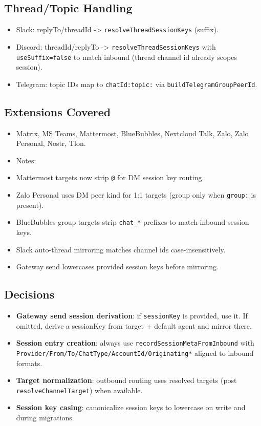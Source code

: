 \subsection{Thread/Topic Handling}


\begin{itemize}
  \item Slack: replyTo/threadId -> \texttt{resolveThreadSessionKeys} (suffix).
  \item Discord: threadId/replyTo -> \texttt{resolveThreadSessionKeys} with \texttt{useSuffix=false} to match inbound (thread channel id already scopes session).
  \item Telegram: topic IDs map to \texttt{chatId:topic:} via \texttt{buildTelegramGroupPeerId}.
\end{itemize}


\subsection{Extensions Covered}


\begin{itemize}
  \item Matrix, MS Teams, Mattermost, BlueBubbles, Nextcloud Talk, Zalo, Zalo Personal, Nostr, Tlon.
  \item Notes:
  \item Mattermost targets now strip \texttt{@} for DM session key routing.
  \item Zalo Personal uses DM peer kind for 1:1 targets (group only when \texttt{group:} is present).
  \item BlueBubbles group targets strip \texttt{chat\_*} prefixes to match inbound session keys.
  \item Slack auto-thread mirroring matches channel ids case-insensitively.
  \item Gateway send lowercases provided session keys before mirroring.
\end{itemize}


\subsection{Decisions}


\begin{itemize}
  \item \textbf{Gateway send session derivation}: if \texttt{sessionKey} is provided, use it. If omitted, derive a sessionKey from target + default agent and mirror there.
  \item \textbf{Session entry creation}: always use \texttt{recordSessionMetaFromInbound} with \texttt{Provider/From/To/ChatType/AccountId/Originating*} aligned to inbound formats.
  \item \textbf{Target normalization}: outbound routing uses resolved targets (post \texttt{resolveChannelTarget}) when available.
  \item \textbf{Session key casing}: canonicalize session keys to lowercase on write and during migrations.
\end{itemize}


